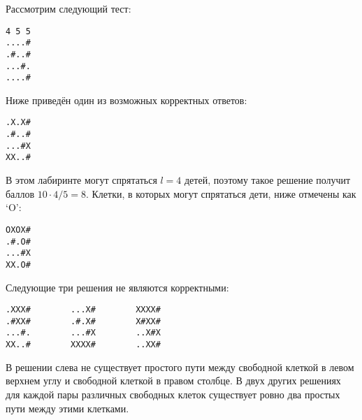 Рассмотрим следующий тест:

\begin{verbatim}
4 5 5
....#
.#..#
...#.
....#
\end{verbatim}


Ниже приведён один из возможных корректных ответов:

\begin{verbatim}
.X.X#
.#..#
...#X
XX..#
\end{verbatim}

В этом лабиринте могут спрятаться $l = 4$ детей, поэтому такое решение получит баллов $10 \cdot 4 / 5 = 8$. Клетки, в которых могут спрятаться дети, ниже отмечены как `O':

\begin{verbatim}
OXOX#
.#.O#
...#X
XX.O#
\end{verbatim}

Следующие три решения не являются корректными:

\begin{verbatim}
.XXX#        ...X#        XXXX#
.#XX#        .#.X#        X#XX#
...#.        ...#X        ..X#X
XX..#        XXXX#        ..XX#
\end{verbatim}

В решении слева не существует простого пути между свободной клеткой в левом верхнем углу
и свободной клеткой в правом столбце. В двух других решениях для каждой пары различных
свободных клеток существует ровно два простых пути между этими клетками.